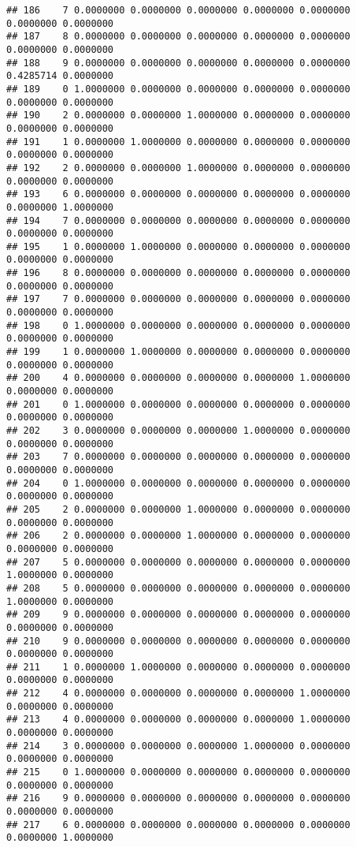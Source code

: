 \documentclass[
]{article}
\begin{document}
\begin{verbatim}
## 186    7 0.0000000 0.0000000 0.0000000 0.0000000 0.0000000 0.0000000 0.0000000
## 187    8 0.0000000 0.0000000 0.0000000 0.0000000 0.0000000 0.0000000 0.0000000
## 188    9 0.0000000 0.0000000 0.0000000 0.0000000 0.0000000 0.4285714 0.0000000
## 189    0 1.0000000 0.0000000 0.0000000 0.0000000 0.0000000 0.0000000 0.0000000
## 190    2 0.0000000 0.0000000 1.0000000 0.0000000 0.0000000 0.0000000 0.0000000
## 191    1 0.0000000 1.0000000 0.0000000 0.0000000 0.0000000 0.0000000 0.0000000
## 192    2 0.0000000 0.0000000 1.0000000 0.0000000 0.0000000 0.0000000 0.0000000
## 193    6 0.0000000 0.0000000 0.0000000 0.0000000 0.0000000 0.0000000 1.0000000
## 194    7 0.0000000 0.0000000 0.0000000 0.0000000 0.0000000 0.0000000 0.0000000
## 195    1 0.0000000 1.0000000 0.0000000 0.0000000 0.0000000 0.0000000 0.0000000
## 196    8 0.0000000 0.0000000 0.0000000 0.0000000 0.0000000 0.0000000 0.0000000
## 197    7 0.0000000 0.0000000 0.0000000 0.0000000 0.0000000 0.0000000 0.0000000
## 198    0 1.0000000 0.0000000 0.0000000 0.0000000 0.0000000 0.0000000 0.0000000
## 199    1 0.0000000 1.0000000 0.0000000 0.0000000 0.0000000 0.0000000 0.0000000
## 200    4 0.0000000 0.0000000 0.0000000 0.0000000 1.0000000 0.0000000 0.0000000
## 201    0 1.0000000 0.0000000 0.0000000 0.0000000 0.0000000 0.0000000 0.0000000
## 202    3 0.0000000 0.0000000 0.0000000 1.0000000 0.0000000 0.0000000 0.0000000
## 203    7 0.0000000 0.0000000 0.0000000 0.0000000 0.0000000 0.0000000 0.0000000
## 204    0 1.0000000 0.0000000 0.0000000 0.0000000 0.0000000 0.0000000 0.0000000
## 205    2 0.0000000 0.0000000 1.0000000 0.0000000 0.0000000 0.0000000 0.0000000
## 206    2 0.0000000 0.0000000 1.0000000 0.0000000 0.0000000 0.0000000 0.0000000
## 207    5 0.0000000 0.0000000 0.0000000 0.0000000 0.0000000 1.0000000 0.0000000
## 208    5 0.0000000 0.0000000 0.0000000 0.0000000 0.0000000 1.0000000 0.0000000
## 209    9 0.0000000 0.0000000 0.0000000 0.0000000 0.0000000 0.0000000 0.0000000
## 210    9 0.0000000 0.0000000 0.0000000 0.0000000 0.0000000 0.0000000 0.0000000
## 211    1 0.0000000 1.0000000 0.0000000 0.0000000 0.0000000 0.0000000 0.0000000
## 212    4 0.0000000 0.0000000 0.0000000 0.0000000 1.0000000 0.0000000 0.0000000
## 213    4 0.0000000 0.0000000 0.0000000 0.0000000 1.0000000 0.0000000 0.0000000
## 214    3 0.0000000 0.0000000 0.0000000 1.0000000 0.0000000 0.0000000 0.0000000
## 215    0 1.0000000 0.0000000 0.0000000 0.0000000 0.0000000 0.0000000 0.0000000
## 216    9 0.0000000 0.0000000 0.0000000 0.0000000 0.0000000 0.0000000 0.0000000
## 217    6 0.0000000 0.0000000 0.0000000 0.0000000 0.0000000 0.0000000 1.0000000

\end{verbatim}
\end{document}
